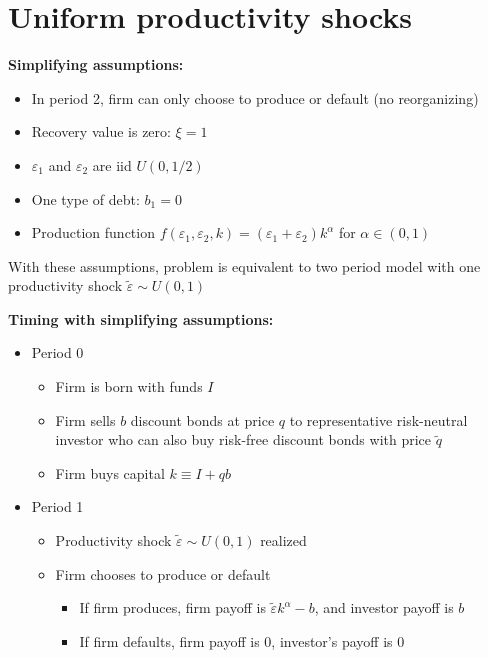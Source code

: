 \documentclass{article}
\begin{document}
\pagebreak

\section*{Uniform productivity shocks}

\textbf{Simplifying assumptions:}

\begin{itemize}
\item In period 2, firm can only choose to produce or default (no reorganizing)
\item Recovery value is zero: $\xi = 1$
\item $\varepsilon_1$ and $\varepsilon_2$ are iid $U(0,1/2)$
\item One type of debt: $b_1 = 0$
\item Production function $f(\varepsilon_1,\varepsilon_2, k) = (\varepsilon_1+\varepsilon_2)k^\alpha$ for $\alpha \in (0,1)$
\end{itemize}

With these assumptions, problem is equivalent to two period model with one productivity shock $\tilde \varepsilon \sim U(0,1)$

\smallskip

\textbf{Timing with simplifying assumptions:}

\begin{itemize}
\item Period 0
\begin{itemize}
\item Firm is born with funds $I$
\item Firm sells $b$ discount bonds at price $q$ to representative risk-neutral investor who can also buy risk-free discount bonds with price $\tilde q$
\item Firm buys capital $k \equiv I + q b$ 
\end{itemize}
\item Period 1
\begin{itemize}
\item Productivity shock $\tilde \varepsilon \sim U(0,1)$ realized
\item Firm chooses to produce or default
\begin{itemize}
\item If firm produces, firm payoff is $\tilde \varepsilon k^\alpha - b$, and investor payoff is $b$
\item If firm defaults, firm payoff is 0, investor's payoff is 0
\end{itemize}
\end{itemize}
\end{itemize}
\end{document}
